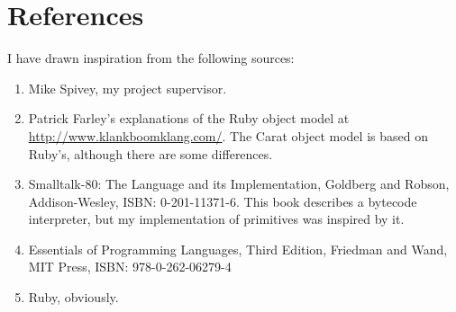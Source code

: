 \section{References}

I have drawn inspiration from the following sources:

\begin{enumerate}
  \item Mike Spivey, my project supervisor.
  
  \item Patrick Farley's explanations of the Ruby object model at \url{http://www.klankboomklang.com/}. The Carat object model is based on Ruby's, although there are some differences.
  
  \item Smalltalk-80: The Language and its Implementation, Goldberg and Robson, Addison-Wesley, ISBN: 0-201-11371-6. This book describes a bytecode interpreter, but my implementation of primitives was inspired by it.
  
  \item Essentials of Programming Languages, Third Edition, Friedman and Wand, MIT Press, ISBN: 978-0-262-06279-4
  
  \item Ruby, obviously.
\end{enumerate}
